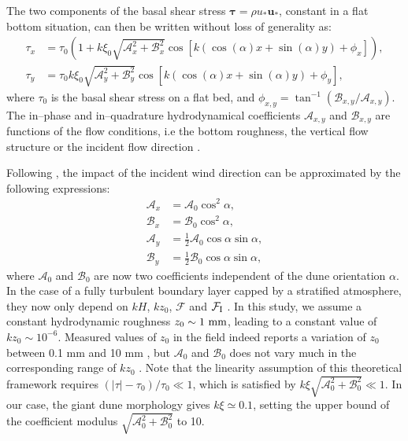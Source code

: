 The two components of the basal shear stress $\boldsymbol{\tau} = \rho u_{*}\boldsymbol{u}_{*}$, constant in a flat bottom situation, can then be written without loss of generality as:
\begin{align}
  \tau_{x} & = \tau_{0}\left(1 + k\xi_{0}\sqrt{\mathcal{A}_{x}^{2} + \mathcal{B}_{x}^{2}}\cos\left[k\left(\cos(\alpha)x + \sin(\alpha)y\right) + \phi_{x}\right]\right), \\
  \tau_{y} & = \tau_{0}k\xi_{0}\sqrt{\mathcal{A}_{y}^{2} + \mathcal{B}_{y}^{2}}\cos\left[k\left(\cos(\alpha)x + \sin(\alpha)y\right) + \phi_{y}\right],
\end{align}
where $\tau_{0}$ is the basal shear stress on a flat bed, and $\phi_{x, y} = \tan^{-1}\left(\mathcal{B}_{x, y}/\mathcal{A}_{x, y}\right)$. The in--phase and in--quadrature hydrodynamical coefficients $\mathcal{A}_{x, y}$ and $\mathcal{B}_{x, y}$ are functions of the flow conditions, i.e the bottom roughness, the vertical flow structure or the incident flow direction \citep{Fourriere2010, andreotti2009, Andreotti2012}.

Following \citet{Andreotti2012}, the impact of the incident wind direction can be approximated by the following expressions:
\begin{align}
  \mathcal{A}_{x} & = \mathcal{A}_{0}\cos^{2}\alpha, \\
  \mathcal{B}_{x} & = \mathcal{B}_{0}\cos^{2}\alpha, \\
  \mathcal{A}_{y} & = \displaystyle\frac{1}{2}\mathcal{A}_{0}\cos\alpha \sin\alpha, \\
  \mathcal{B}_{y} & = \displaystyle\frac{1}{2}\mathcal{B}_{0}\cos\alpha \sin\alpha,
\end{align}
where $\mathcal{A}_{0}$ and $\mathcal{B}_{0}$ are now two coefficients independent of the dune orientation $\alpha$. In the case of a fully turbulent boundary layer capped by a stratified atmosphere, they now only depend on $k H$, $k z_{0}$, $\mathcal{F}$ and $\mathcal{F}_{\textup{I}}$ \citet{andreotti2009}. In this study, we assume a constant hydrodynamic roughness $z_{0} \sim 1~\textup{mm}$, leading to a constant value of $k z_{0} \sim 10^{-6}$. Measured values of $z_{0}$ in the field indeed reports a variation of $z_{0}$ between 0.1 mm and 10 mm \citep{Sherman2008, Field2018}, but $\mathcal{A}_{0}$ and $\mathcal{B}_{0}$ does not vary much in the corresponding range of $k z_{0}$ \citep{Fourriere2010}.
%
Note that the linearity assumption of this theoretical framework requires $\left(\vert \tau \vert - \tau_{0}\right)/\tau_{0} \ll 1$, which is satisfied by $k\xi\sqrt{\mathcal{A}_{0}^{2} + \mathcal{B}_{0}^{2}} \ll 1$. In our case, the giant dune morphology gives $k\xi \simeq 0.1$, setting the upper bound of the coefficient modulus $\sqrt{\mathcal{A}_{0}^{2} + \mathcal{B}_{0}^{2}}$ to 10.


